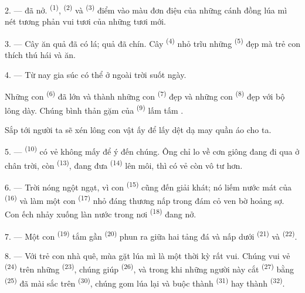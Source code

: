 2. ---  đã nở.  \textsuperscript{(1)},
 \textsuperscript{(2)} và 
\textsuperscript{(3)} điểm vào màu đơn điệu của những cánh đồng lúa mì nét tương phản
vui tươi của những  tươi mới.

3. --- Cây ăn quả đã có lá; quả đã chín. Cây  \textsuperscript{(4)} nhỏ
trĩu những  \textsuperscript{(5)} đẹp mà trẻ con thích thú hái và
ăn.

4. --- Từ nay gia súc có thể ở ngoài trời suốt ngày.

Những con  \textsuperscript{(6)} đã lớn và thành những con  \textsuperscript{(7)} đẹp và những con  \textsuperscript{(8)} đẹp
với bộ lông dày. Chúng bình thản gặm  của 
\textsuperscript{(9)} lấm tấm .

Sắp tới người ta sẽ xén lông  con vật ấy để lấy  dệt dạ may
quần áo cho ta.

\VUsaut{5.0mm}
\VUsaut{3.4mm}

5. ---  \textsuperscript{(10)} có vẻ không mấy để ý đến chúng.
Ông chỉ lo về cơn giông đang đi qua ở chân trời, còn 
\textsuperscript{(13)}, đang đưa  \textsuperscript{(14)} lên môi, thì
có vẻ còn vô tư hơn.

6. --- Trời nóng ngột ngạt, vì con  \textsuperscript{(15)} cũng đến giải
khát; nó liếm nước mát của  \textsuperscript{(16)} và làm một con
 \textsuperscript{(17)} nhỏ đáng thương nấp trong đám cỏ ven bờ hoảng sợ. Con
ếch nhảy xuống làn nước trong nơi  \textsuperscript{(18)} đang nở.

7. --- Một con  \textsuperscript{(19)} tắm gần  \textsuperscript{(20)} phun ra giữa hai tảng đá và nấp dưới 
\textsuperscript{(21)} và  \textsuperscript{(22)}.

\VUsaut{5.0mm}
\VUsaut{3.4mm}

8. --- Với trẻ con nhà quê, mùa gặt lúa mì là một thời kỳ rất vui. Chúng vui vẻ
 \textsuperscript{(24)} trên những 
\textsuperscript{(23)}, chúng giúp  \textsuperscript{(26)}, và trong khi
những người này cắt  \textsuperscript{(27)} bằng 
\textsuperscript{(25)} đã mài sắc trên  \textsuperscript{(30)}, chúng gom
lúa lại và buộc thành  \textsuperscript{(31)} hay thành 
\textsuperscript{(32)}.

